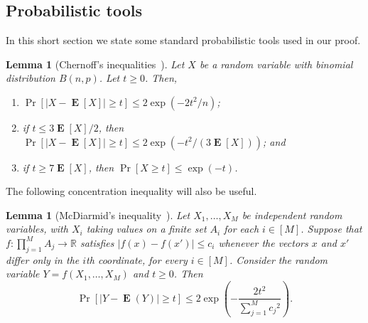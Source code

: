 \documentclass[a4paper, 11pt,reqno]{amsart}
\theoremstyle{plain}
\newtheorem{lemma}[theorem]{Lemma}
\theoremstyle{definition}
\numberwithin{equation}{section}
\DeclareMathOperator{\probability}{Pr}
\DeclareMathOperator{\expectation}{\mathbf{E}}
\begin{document}
\subsection{Probabilistic tools}

In this short section we state some standard probabilistic tools used
in our proof. 

\begin{lemma}[Chernoff's inequalities~{\cite[Remark 2.5, Corollaries 2.3 and 2.4]{JLR00}}]
  \label{lemma:chernoff}
  Let $X$ be a random variable with binomial distribution $B(n,p)$.
  Let $t \geq 0$.
  Then, 
  \begin{enumerate}
  	\item \label{chernoff:standard} $\probability[|X - \expectation[X]| \geq t] \leq
  	2\exp(-2t^2/n)$;
  	\item \label{chernoff:smallexpectation} if $t \leq 3 \expectation[X] / 2$, then
  	$\probability[|X - \expectation[X]| \geq t] \leq
  	2\exp(-{t^2}/({3\expectation[X]}))$; and
  	\item \label{chernoff:verysmallexpectation} if $t \geq 7
          \expectation[X]$, then $\probability[X \geq t] \leq
          \exp(-t)$.
  \end{enumerate}
\end{lemma}

The following concentration inequality will also be useful.

\begin{lemma}[McDiarmid's inequality~\cite{McDiarmid1989}]
    \label{lemma:mcdiarmid}
  Let $X_1, \ldots, X_M$ be independent random variables, with $X_i$
  taking values on a finite set $A_i$ for each $i \in [M]$. Suppose
  that $f:\prod_{j=1}^{M} A_j \rightarrow \mathbb{R}$ satisfies $|f(x)
  - f(x')| \leq c_i$ whenever the vectors $x$ and $x'$ differ only in
  the $i$th coordinate, for every $i \in [M]$. Consider the random variable $Y =
  f(X_1, \ldots, X_M)$ and $t \geq 0$.
  Then
  \begin{equation*}
    \probability[|Y - \expectation(Y)| \geq t] \leq 2 \exp\left(-
    \frac{2t^2}{\sum_{j=1}^M {c_j}^2}\right).
  \end{equation*}
\end{lemma}

\end{document}
